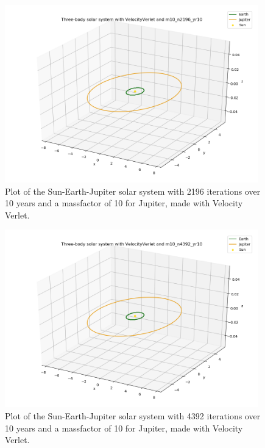 \documentclass{article}
\begin{document}
    \begin{figure}[H]
        \centering
        \includegraphics[width = 11cm]{img/plot3D_S_E_J_V_m10_n2196_yr10.png}
        \caption{Plot of the Sun-Earth-Jupiter solar system with 2196 iterations over 10 years and a massfactor of 10 for Jupiter, made with Velocity Verlet.}
        \label{fig:plot3D_S_E_J_V_m10_n2196_yr10}
    \end{figure}

    \begin{figure}[H]
        \centering
        \includegraphics[width = 11cm]{img/plot3D_S_E_J_V_m10_n4392_yr10.png}
        \caption{Plot of the Sun-Earth-Jupiter solar system with 4392 iterations over 10 years and a massfactor of 10 for Jupiter, made with Velocity Verlet.}
        \label{fig:plot3D_S_E_J_V_m10_n4392_yr10}
    \end{figure}
\end{document}
